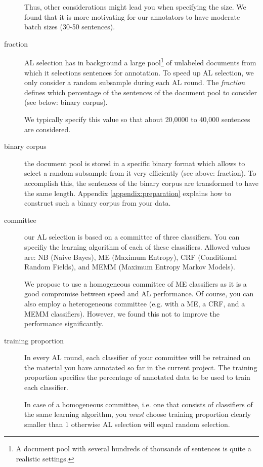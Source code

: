 \documentclass[DIV12,english,11pt,halfparskip]{scrartcl}
\begin{document}
\begin{appendix}
\begin{description}
  Thus, other considerations might lead you when specifying the size.
  We found that it is more motivating for our annotators to have
  moderate batch sizes (30-50 sentences).

\item[fraction] AL selection has in background a large pool\footnote{A
    document pool with several hundreds of thousands of sentences is
    quite a realistic settings.} of unlabeled documents from which it
  selections sentences for annotation. To speed up AL selection, we
  only consider a random subsample during each AL round. The
  \emph{fraction} defines which percentage of the sentences of the
  document pool to consider (see below: binary corpus).

  We typically specify this value so that about 20,0000 to 40,000
  sentences are considered.

\item[binary corpus] the document pool is stored in a specific binary
  format which allows to select a random subsample from it very
  efficiently (see above: fraction). To accomplish this, the sentences
  of the binary corpus are transformed to have the same length.
  Appendix \ref{appendix:preparation} explains how to construct such a
  binary corpus from your data.

\item[committee] our AL selection is based on a committee of three
  classifiers. You can specifiy the learning algorithm of each of
  these classifiers. Allowed values are: NB (Naive Bayes), ME (Maximum
  Entropy), CRF (Conditional Random Fields), and MEMM (Maximum Entropy
  Markov Models). 

  We propose to use a homogeneous committee of ME classifiers as it is
  a good compromise between speed and AL performance. Of course, you
  can also employ a heterogeneous committee (e.g. with a ME, a CRF,
  and a MEMM classifiers). However, we found this not to improve the
  performance significantly.

\item[training proportion] In every AL round, each classifier of your
  committee will be retrained on the material you have annotated so
  far in the current project. The training proportion specifies the
  percentage of annotated data to be used to train each classifier.

  In case of a homogeneous committee, i.e. one that consists of
  classifiers of the same learning algorithm, you \emph{must} choose
  training proportion clearly smaller than $1$ otherwise AL selection
  will equal random selection.


\end{description}
\end{appendix}
\end{document}
